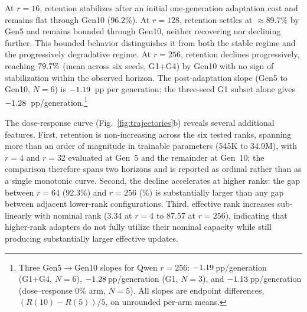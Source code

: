 \documentclass[a4paper,fleqn]{cas-dc}
\newif\ifshowchanges
\newcommand{\rev}[1]{\ifshowchanges{\color{blue}#1}\else{#1}\fi}
\begin{document}
At $r=16$, retention stabilizes after
an initial one-generation adaptation cost and remains flat through Gen10
(96.2\%). At $r=128$, retention settles at
$\approx$89.7\% by Gen5 and remains bounded through Gen10, neither
recovering nor declining further. This bounded behavior distinguishes it from
both the stable regime and the progressively degradative regime. At
$r=256$, retention declines progressively,
reaching \rev{$79.7\%$} (mean across \rev{six seeds, G1$+$G4}) by Gen10 with no sign of
stabilization within the observed horizon. The post-adaptation slope
\rev{(Gen5 to Gen10, $N=6$) is $-1.19$~pp per generation; the three-seed G1 subset alone gives $-1.28$~pp/generation.}\footnote{\rev{Three Gen5$\to$Gen10 slopes for Qwen $r=256$: $-1.19$\,pp/generation (G1+G4, $N=6$), $-1.28$\,pp/generation (G1, $N=3$), and $-1.13$\,pp/generation (dose--response 0\% arm, $N=5$). All slopes are endpoint differences, $(R(10)-R(5))/5$, on unrounded per-arm means.}}

The dose-response curve (Fig.~\ref{fig:trajectories}b) reveals several
additional features. First, \rev{retention is non-increasing across the six tested ranks, spanning more than an order of magnitude in trainable parameters (545K to 34.9M), with $r=4$ and $r=32$ evaluated at Gen~5 and the remainder at Gen~10; the comparison therefore spans two horizons and is reported as ordinal rather than as a single monotonic curve}. Second, the
decline accelerates at higher ranks: the gap between $r=64$ (92.3\%) and $r=256$
(\GoneMten\%) is substantially larger than any gap between adjacent lower-rank
configurations. Third, effective rank increases sub-linearly with nominal rank
(3.34 at $r=4$ to 87.57 at $r=256$), indicating that higher-rank adapters do not
fully utilize their nominal capacity while still producing substantially larger
effective updates.
\end{document}

